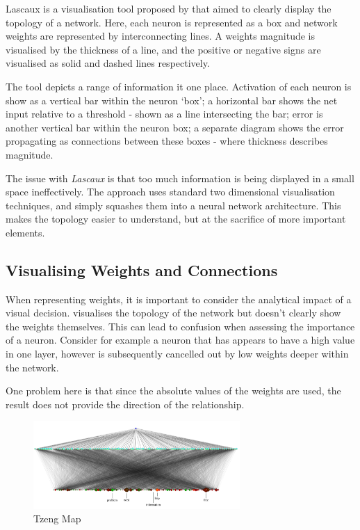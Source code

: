 \documentclass[a4paper,11pt,titlepage]{article}
\begin{document}
		Lascaux is a visualisation tool proposed by \cite{Craven1992} that aimed to clearly display the topology of a network. Here, each neuron is represented as a box and network weights are represented by interconnecting lines. A weights magnitude is visualised by the thickness of a line, and the positive or negative signs are visualised as solid and dashed lines respectively.
		\par 
		The tool depicts a range of information it one place. Activation of each neuron is show as a vertical bar within the neuron `box'; a horizontal bar shows the net input relative to a threshold - shown as a line intersecting the bar; error is another vertical bar within the neuron box; a separate diagram shows the error propagating as connections between these boxes - where thickness describes magnitude.
		\par 
		The issue with \textit{Lascaux} is that too much information is being displayed in a small space ineffectively. The approach uses standard two dimensional visualisation techniques, and simply squashes them into a neural network architecture. This makes the topology easier to understand, but at the sacrifice of more important elements.

\subsection{Visualising Weights and Connections}
		When representing weights, it is important to consider the analytical impact of a visual decision. \cite{Streeter2001} visualises the topology of the network but doesn't clearly show the weights themselves. This can lead to confusion when assessing the importance of a neuron. Consider for example a neuron that has appears to have a high value in one layer, however is subsequently cancelled out by low weights deeper within the network.
	\par 
	One problem here is that since the absolute values of the weights are used, the result does not provide the direction of the relationship. 
	\par 
		
	\begin{figure}[H]
		\centering 
    		\includegraphics[width=0.7\textwidth]{img/tzeng_large_map.png} 
    		\caption{Tzeng Map}%
 	\end{figure}
 	
\end{document}
